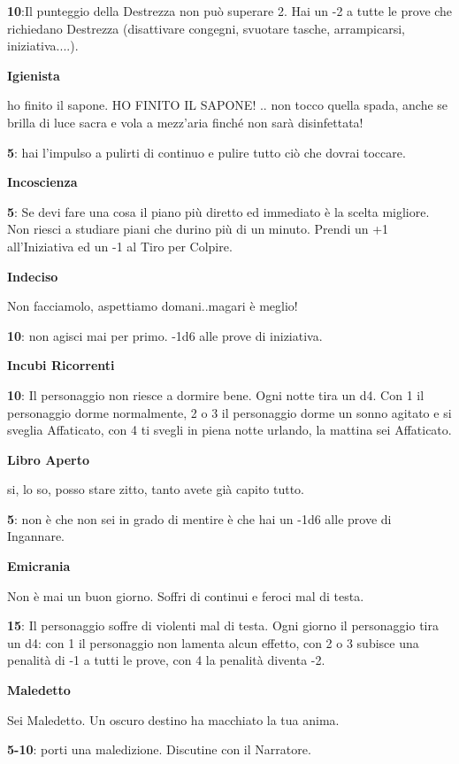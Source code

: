 \documentclass[a4paper,twoside,openany]{book}
\begin{document}
\begin{multicols}{2}
\textbf{10}:Il punteggio della Destrezza non può superare 2. Hai un -2 a tutte le prove che richiedano Destrezza (disattivare congegni, svuotare tasche, arrampicarsi, iniziativa....).

\textbf{Igienista}

ho finito il sapone. HO FINITO IL SAPONE! .. non tocco quella spada, anche se brilla di luce sacra e vola a mezz'aria finché non sarà disinfettata!

\textbf{5}: hai l'impulso a pulirti di continuo e pulire tutto ciò che dovrai toccare.

\textbf{Incoscienza}

\textbf{5}: Se devi fare una cosa il piano più diretto ed immediato è la scelta migliore. Non riesci a studiare piani che durino più di un minuto. Prendi un +1 all'Iniziativa ed un -1 al Tiro per Colpire.

\textbf{Indeciso}

Non facciamolo, aspettiamo domani..magari è meglio!

\textbf{10}: non agisci mai per primo. -1d6 alle prove di iniziativa.

\textbf{Incubi Ricorrenti}

\textbf{10}: Il personaggio non riesce a dormire bene. Ogni notte tira un d4. Con 1 il personaggio dorme normalmente, 2 o 3 il personaggio dorme un sonno agitato e si sveglia Affaticato, con 4 ti svegli in piena notte urlando, la mattina sei Affaticato.

\textbf{Libro Aperto}

si, lo so, posso stare zitto, tanto avete già capito tutto.

\textbf{5}: non è che non sei in grado di mentire è che hai un -1d6 alle prove di Ingannare.

\textbf{Emicrania}

Non è mai un buon giorno. Soffri di continui e feroci mal di testa.

\textbf{15}: Il personaggio soffre di violenti mal di testa. Ogni giorno il personaggio tira un d4: con 1 il personaggio non lamenta alcun effetto, con 2 o 3 subisce una penalità di -1 a tutti le prove, con 4 la penalità diventa -2.

\textbf{Maledetto}

Sei Maledetto. Un oscuro destino ha macchiato la tua anima.

\textbf{5-10}: porti una maledizione. Discutine con il Narratore.


\end{multicols}
\end{document}
